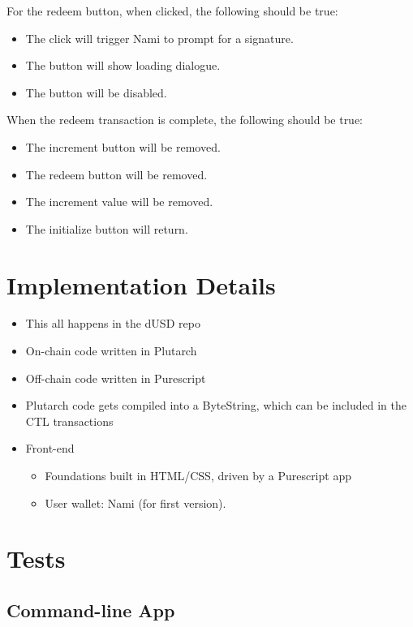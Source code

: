\documentclass{article}
\begin{document}
For the redeem button, when clicked, the following should be true:

\begin{itemize}
  \item The click will trigger Nami to prompt for a signature.
  \item The button will show loading dialogue.
  \item The button will be disabled.
\end{itemize}

When the redeem transaction is complete, the following should be true:

\begin{itemize}
  \item The increment button will be removed.
  \item The redeem button will be removed.
  \item The increment value will be removed.
  \item The initialize button will return.
\end{itemize}


\section{Implementation Details}

\begin{itemize}
  \item This all happens in the dUSD repo
  \item On-chain code written in Plutarch
  \item Off-chain code written in Purescript
  \item Plutarch code gets compiled into a ByteString, which can be included in
    the CTL transactions
  \item Front-end
  \begin{itemize}
    \item Foundations built in HTML/CSS, driven by a Purescript app
    \item User wallet: Nami (for first version).
  \end{itemize}

\end{itemize}

\section{Tests}

\subsection{Command-line App}
\end{document}
